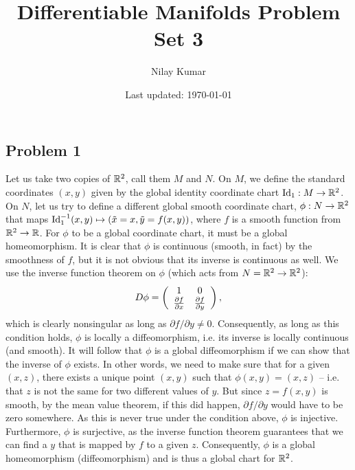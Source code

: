 \documentclass{../../mathnotes}
\title{Differentiable Manifolds Problem Set 3}
\author{Nilay Kumar}
\date{Last updated: \today}
\begin{document}
\maketitle

\subsection*{Problem 1}

Let us take two copies of $\mathbb{R}^2$, call them $M$ and $N$. On $M$, we define the standard coordinates $(x,y)$
given by the global identity coordinate chart $\operatorname{Id}_1:M\to\mathbb{R}^2$. On $N$, let us try to define a different global smooth
coordinate chart, $\phi:N\to\mathbb{R}^2$ that maps $\operatorname{Id}_1^{-1}(x,y)\mapsto \left( \tilde x=x,\tilde y=f(x,y) \right)$,
where $f$ is a smooth function from $\mathbb{R}^2\to\mathbb{R}$. For $\phi$ to be a global coordinate chart, it must be a global
homeomorphism. It is clear that $\phi$ is continuous (smooth, in fact) by the smoothness of $f$, but it is not obvious
that its inverse is continuous as well. We use the inverse function theorem on $\phi$ (which acts
from $N=\mathbb{R}^2\to\mathbb{R}^2$):
\begin{align*}
    D\phi=\left(
    \begin{array}[]{cc}
        1 & 0\\
        \frac{\partial f}{\partial x} & \frac{\partial f}{\partial y}
    \end{array}
    \right),
\end{align*}
which is clearly nonsingular as long as $\partial f/\partial y\neq 0$. Consequently, as long as this condition holds,
$\phi$ is locally a diffeomorphism, i.e. its inverse is locally continuous (and smooth).
It will follow that $\phi$ is a global diffeomorphism if we can show that the inverse of $\phi$ exists.
In other words, we need to make sure that for a given $(x,z)$, there exists a unique point $(x,y)$ such that
$\phi(x,y)=(x,z)$ -- i.e. that $z$ is not the same for two different values of $y$. But since $z=f(x,y)$
is smooth, by the mean value theorem, if this did happen, $\partial f/\partial y$ would have to be zero
somewhere. As this is never true under the condition above, $\phi$ is injective. Furthermore, $\phi$ is
surjective, as the inverse function theorem guarantees that we can find a $y$ that is mapped by $f$ to a given
$z$. Consequently, $\phi$ is a global homeomorphism (diffeomorphism) and is thus a global chart for $\mathbb{R}^2$.
\end{document}
